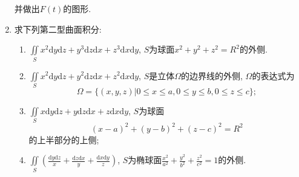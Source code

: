 \begin{enumerate}
并做出$F(t)$的图形.
\item 求下列第二型曲面积分:
\begin{enumerate}
	\item $\displaystyle{\iint\limits_{S}x^2\mathrm{d}y\mathrm{d}z+y^3\mathrm{d}z\mathrm{d}x+z^3\mathrm{d}x\mathrm{d}y}$, $S$为球面$x^2+y^2+z^2=R^2$的外侧.
	\item $\displaystyle{\iint\limits_{S}x^2\mathrm{d}y\mathrm{d}z+y^2\mathrm{d}z\mathrm{d}x+z^2\mathrm{d}x\mathrm{d}y}$, $S$是立体$\Omega$的边界线的外侧, $\Omega$的表达式为$$
	\Omega = \{(x,y,z)|0\le x\le a,0\le y\le b,0\le z\le c\};$$
	\item $\displaystyle{\iint\limits_{S}x\mathrm{d}y\mathrm{d}z+y\mathrm{d}z\mathrm{d}x+z\mathrm{d}x\mathrm{d}y}$, $S$为球面
	$$ (x-a)^2+(y-b)^2+(z-c)^2=R^2$$的上半部分的上侧;
	\item $\displaystyle{\iint\limits_{S}\left(\frac{\mathrm{d}y\mathrm{d}z}{x}+\frac{\mathrm{d}z\mathrm{d}x}{y}+\frac{\mathrm{d}x\mathrm{d}y}{z}\right)}$, $S$为椭球面$\frac{x^2}{a^2}+\frac{y^2}{b^2}+\frac{z^2}{c^2}=1$的外侧.
\end{enumerate}
\end{enumerate}

